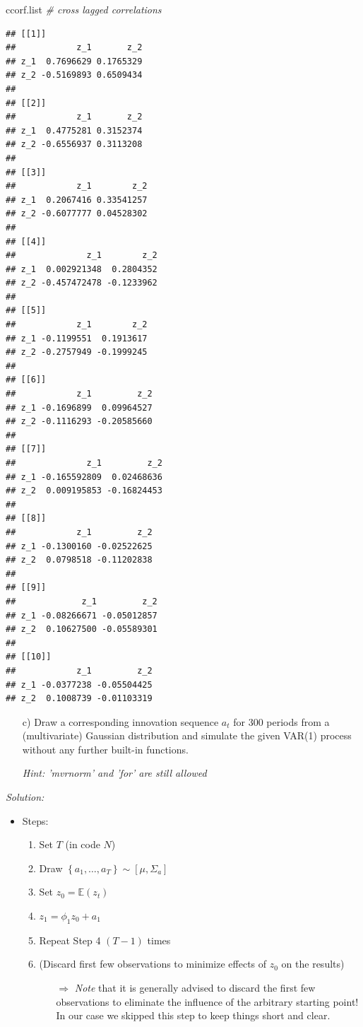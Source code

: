 \documentclass[12pt,a4paper]{article}
\newenvironment{Shaded}{\begin{snugshade}}{\end{snugshade}}
\newcommand{\CommentTok}[1]{\textcolor[rgb]{0.56,0.35,0.01}{\textit{#1}}}
\newcommand{\NormalTok}[1]{#1}
\begin{document}
\begin{Shaded}
\begin{Highlighting}[]
\NormalTok{ccorf.list }\CommentTok{# cross lagged correlations}
\end{Highlighting}
\end{Shaded}

\begin{verbatim}
## [[1]]
##            z_1       z_2
## z_1  0.7696629 0.1765329
## z_2 -0.5169893 0.6509434
## 
## [[2]]
##            z_1       z_2
## z_1  0.4775281 0.3152374
## z_2 -0.6556937 0.3113208
## 
## [[3]]
##            z_1        z_2
## z_1  0.2067416 0.33541257
## z_2 -0.6077777 0.04528302
## 
## [[4]]
##              z_1        z_2
## z_1  0.002921348  0.2804352
## z_2 -0.457472478 -0.1233962
## 
## [[5]]
##            z_1        z_2
## z_1 -0.1199551  0.1913617
## z_2 -0.2757949 -0.1999245
## 
## [[6]]
##            z_1         z_2
## z_1 -0.1696899  0.09964527
## z_2 -0.1116293 -0.20585660
## 
## [[7]]
##              z_1         z_2
## z_1 -0.165592809  0.02468636
## z_2  0.009195853 -0.16824453
## 
## [[8]]
##            z_1         z_2
## z_1 -0.1300160 -0.02522625
## z_2  0.0798518 -0.11202838
## 
## [[9]]
##             z_1         z_2
## z_1 -0.08266671 -0.05012857
## z_2  0.10627500 -0.05589301
## 
## [[10]]
##            z_1         z_2
## z_1 -0.0377238 -0.05504425
## z_2  0.1008739 -0.01103319
\end{verbatim}

\begin{itemize}
  \item[c)] Draw a corresponding innovation sequence $a_t$ for 300 periods from a (multivariate) Gaussian distribution and simulate the given VAR(1) process without any further built-in functions.
  \item[] \textit{Hint: 'mvrnorm' and 'for' are still allowed}
\end{itemize}

\emph{Solution:}\\

\begin{itemize}
  \item Steps:
  \begin{enumerate}
    \item Set $T$ (in code $N$)
    \item Draw $\left\{ a_1, \ldots , a_T \right\} \sim \left[ \mu , \Sigma_a \right]$
    \item Set $z_0 = \mathbb{E} \left( z_t\right)$
    \item $z_1 = \phi_1 z_0 + a_1$
    \item Repeat Step 4 $(T - 1)$ times
    \item (Discard first few observations to minimize effects of $z_0$ on the results)
    \begin{itemize}
      \item[$\Rightarrow$] \textit{Note} that it is generally advised to discard the first few observations to eliminate the influence of the arbitrary starting point! In our case we skipped this step to keep things short and clear.
    \end{itemize}
  \end{enumerate}
\end{itemize}
\end{document}
